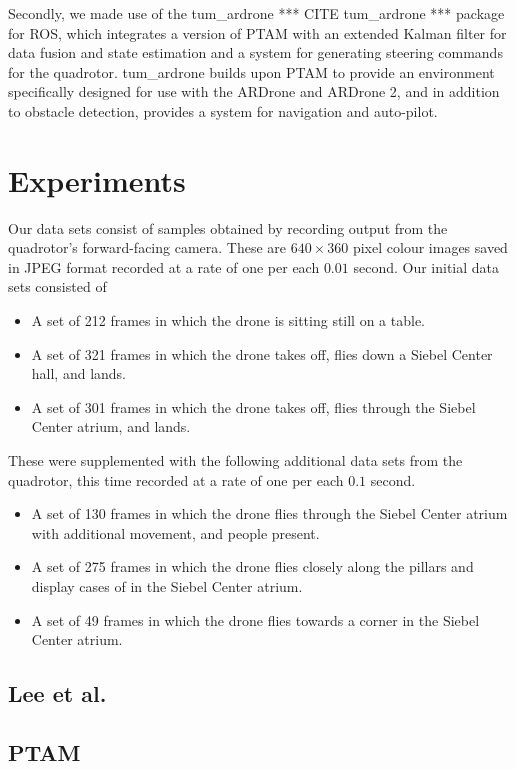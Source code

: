 \documentclass{acmsiggraph}
\begin{document}
Secondly, we made use of the tum\_ardrone *** CITE tum\_ardrone *** package for ROS, which integrates a version of PTAM with an extended Kalman filter for data fusion and state estimation and a system for generating steering commands for the quadrotor. tum\_ardrone builds upon PTAM to provide an environment specifically designed for use with the ARDrone and ARDrone 2, and in addition to obstacle detection, provides a system for navigation and auto-pilot.

\section{Experiments}
Our data sets consist of samples obtained by recording output from the quadrotor's forward-facing camera. These are $640 \times 360$ pixel colour images saved in JPEG format recorded at a rate of one per each $0.01$ second. Our initial data sets consisted of
\begin{itemize}
\item A set of 212 frames in which the drone is sitting still on a table.
\item A set of 321 frames in which the drone takes off, flies down a Siebel Center hall, and lands.
\item A set of 301 frames in which the drone takes off, flies through the Siebel Center atrium, and lands.
\end{itemize}
These were supplemented with the following additional data sets from the quadrotor, this time recorded at a rate of one per each $0.1$ second.
\begin{itemize}
\item A set of 130 frames in which the drone flies through the Siebel Center atrium with additional movement, and people present.
\item A set of 275 frames in which the drone flies closely along the pillars and display cases of in the Siebel Center atrium.
\item A set of 49 frames in which the drone flies towards a corner in the Siebel Center atrium.
\end{itemize}

\subsection{Lee et al.}


\subsection{PTAM}
\end{document}
